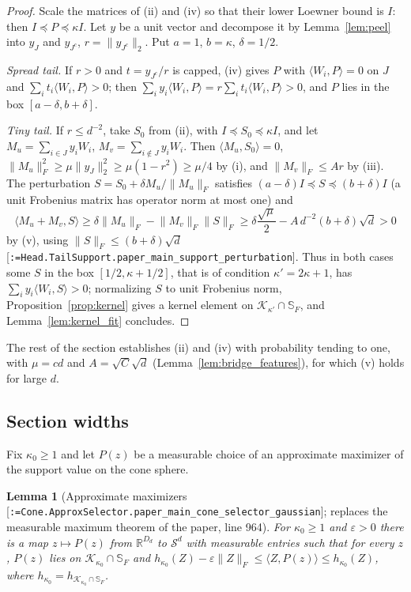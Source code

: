 \documentclass[11pt]{article}
\makeatletter
\newcommand{\formal@break}[1]{\@tfor\formal@tok:=#1\do{%
  \formal@tok
  \expandafter\ifx\formal@tok.\allowbreak\else
  \expandafter\ifx\formal@tok\_\allowbreak\fi\fi}}
\DeclareRobustCommand{\formal}[1]{\textnormal{[\texttt{\small\formal@break{#1}}]}}
\newcommand{\R}{\mathbb{R}}
\newcommand{\Sym}{\mathcal{S}}
\newcommand{\ip}[2]{\langle #1, #2\rangle}
\newcommand{\norm}[1]{\lVert #1\rVert}
\newcommand{\Fro}{F}
\newcommand{\sqd}{\sqrt{d}}
\newcommand{\Id}{I}
\newcommand{\cone}{\mathcal{K}}
\newcommand{\Dd}{D}
\theoremstyle{plain}
\newtheorem{lemma}[theorem]{Lemma}
\theoremstyle{definition}
\makeatother
\begin{document}
\begin{proof}
Scale the matrices of (ii) and (iv) so that their lower Loewner bound is
$\Id$: then $\Id \preceq P \preceq \kappa\Id$. Let $y$ be a unit vector and
decompose it by Lemma~\ref{lem:peel} into $y_J$ and $y_{J^c}$,
$r = \norm{y_{J^c}}_2$. Put $a = 1$, $b = \kappa$, $\delta = 1/2$.

\emph{Spread tail.} If $r > 0$ and $t = y_{J^c}/r$ is capped, (iv) gives $P$
with $\ip{W_i}{P} = 0$ on $J$ and $\sum_it_i\ip{W_i}{P} > 0$; then
$\sum_iy_i\ip{W_i}{P} = r\sum_it_i\ip{W_i}{P} > 0$, and $P$ lies in the box
$[a - \delta, b + \delta]$.

\emph{Tiny tail.} If $r \le d^{-2}$, take $S_0$ from (ii), with $\Id \preceq S_0 \preceq \kappa\Id$,
and let $M_u = \sum_{i\in J}y_iW_i$, $M_v = \sum_{i\notin J}y_iW_i$. Then
$\ip{M_u}{S_0} = 0$, $\norm{M_u}_\Fro^2 \ge \mu\norm{y_J}_2^2 \ge \mu(1 - r^2) \ge \mu/4$
by (i), and $\norm{M_v}_\Fro \le Ar$ by (iii). The perturbation
$S = S_0 + \delta M_u/\norm{M_u}_\Fro$ satisfies
$(a - \delta)\Id \preceq S \preceq (b + \delta)\Id$ (a unit Frobenius matrix
has operator norm at most one) and
\[
\ip{M_u + M_v}{S} \ge \delta\norm{M_u}_\Fro - \norm{M_v}_\Fro\norm{S}_\Fro
\ge \delta\frac{\sqrt\mu}{2} - A\,d^{-2}(b + \delta)\sqd > 0
\]
by (v), using $\norm{S}_\Fro \le (b+\delta)\sqd$
\formal{Head.TailSupport.paper\_main\_support\_perturbation}. Thus in both
cases some $S$ in the box $[1/2, \kappa + 1/2]$, that is of condition
$\kappa' = 2\kappa + 1$, has $\sum_iy_i\ip{W_i}{S} > 0$; normalizing $S$ to
unit Frobenius norm, Proposition~\ref{prop:kernel} gives a kernel element on
$\cone_{\kappa'}\cap\mathbb{S}_\Fro$, and Lemma~\ref{lem:kernel_fit} concludes.
\end{proof}

The rest of the section establishes (ii) and (iv) with probability tending
to one, with $\mu = cd$ and $A = \sqrt{C}\sqd$ (Lemma~\ref{lem:bridge_features}),
for which (v) holds for large $d$.

\subsection{Section widths}\label{sec:widths}

Fix $\kappa_0 \ge 1$ and let $P(z)$ be a measurable choice of an
approximate maximizer of the support value on the cone sphere.

\begin{lemma}[Approximate maximizers \formal{Cone.ApproxSelector.paper\_main\_cone\_selector\_gaussian}; replaces the measurable maximum theorem of the paper, line 964]\label{lem:selector}
For $\kappa_0 \ge 1$ and $\varepsilon > 0$ there is a map $z \mapsto P(z)$ from
$\R^{\Dd_d}$ to $\Sym^d$ with measurable entries such that for every $z$,
$P(z)$ lies on $\cone_{\kappa_0}\cap\mathbb{S}_\Fro$ and
$h_{\kappa_0}(Z) - \varepsilon\norm{Z}_\Fro \le \ip{Z}{P(z)} \le h_{\kappa_0}(Z)$,
where $h_{\kappa_0} = h_{\cone_{\kappa_0}\cap\mathbb{S}_\Fro}$.
\end{lemma}
\end{document}
